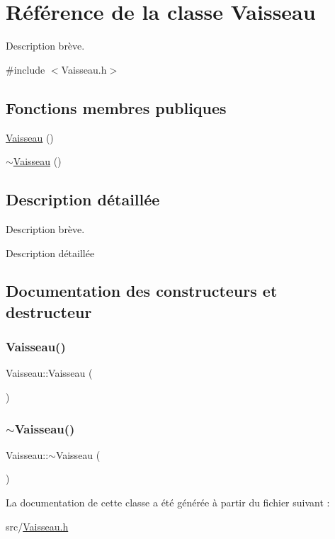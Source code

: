 \hypertarget{class_vaisseau}{}\section{Référence de la classe Vaisseau}
\label{class_vaisseau}


Description brève.  




{\ttfamily \#include $<$Vaisseau.\+h$>$}

\subsection*{Fonctions membres publiques}
\begin{DoxyCompactItemize}
\item 
\hyperlink{class_vaisseau_a86378a70f0d92fcc6c5c5973574b2b7d}{Vaisseau} ()
\item 
\hyperlink{class_vaisseau_ae40b8e0143d6b736065207281bde2e8a}{$\sim$\+Vaisseau} ()
\end{DoxyCompactItemize}


\subsection{Description détaillée}
Description brève. 

Description détaillée 

\subsection{Documentation des constructeurs et destructeur}
\mbox{\label{class_vaisseau_a86378a70f0d92fcc6c5c5973574b2b7d}} 
\subsubsection{\texorpdfstring{Vaisseau()}{Vaisseau()}}
{\footnotesize\ttfamily Vaisseau\+::\+Vaisseau (\begin{DoxyParamCaption}{ }\end{DoxyParamCaption})}

\mbox{\label{class_vaisseau_ae40b8e0143d6b736065207281bde2e8a}} 
\subsubsection{\texorpdfstring{$\sim$\+Vaisseau()}{~Vaisseau()}}
{\footnotesize\ttfamily Vaisseau\+::$\sim$\+Vaisseau (\begin{DoxyParamCaption}{ }\end{DoxyParamCaption})}



La documentation de cette classe a été générée à partir du fichier suivant \+:\begin{DoxyCompactItemize}
\item 
src/\hyperlink{_vaisseau_8h}{Vaisseau.\+h}\end{DoxyCompactItemize}
